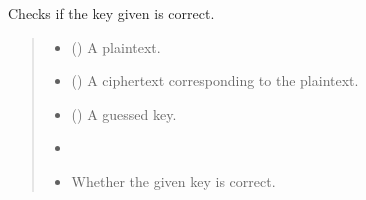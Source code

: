 \documentclass[letterpaper,10pt,english]{sphinxmanual}
\begin{document}
\begin{fulllineitems}
\begin{fulllineitems}
\begin{quote}
\begin{description}
\begin{itemize}
\end{itemize}

\end{description}\end{quote}

\end{fulllineitems}


\begin{fulllineitems}
\label{\detokenize{MLSCAlib.Ciphers:MLSCAlib.Ciphers.AES_leakage.AESLeakageModel.check_key}}
\pysigstartsignatures
{}
\pysigstopsignatures
\sphinxAtStartPar
Checks if the key given is correct.
\begin{quote}\begin{description}
\begin{itemize}
\item {} 
\sphinxAtStartPar
{} (\sphinxstyleliteralemphasis{\sphinxupquote{{[}}}\sphinxstyleliteralemphasis{\sphinxupquote{{]}}}) \textendash{} A plaintext.

\item {} 
\sphinxAtStartPar
{} (\sphinxstyleliteralemphasis{\sphinxupquote{{[}}}\sphinxstyleliteralemphasis{\sphinxupquote{{]}}}) \textendash{} A ciphertext corresponding to the plaintext.

\item {} 
\sphinxAtStartPar
{} (\sphinxstyleliteralemphasis{\sphinxupquote{{[}}}\sphinxstyleliteralemphasis{\sphinxupquote{{]}}}) \textendash{} A guessed key.

\item {} 
\sphinxAtStartPar
{} \textendash{} 

\item {} 
\sphinxAtStartPar
{} \textendash{} Whether the given key is correct.


\end{itemize}
\end{description}
\end{quote}
\end{fulllineitems}
\end{fulllineitems}
\end{document}
